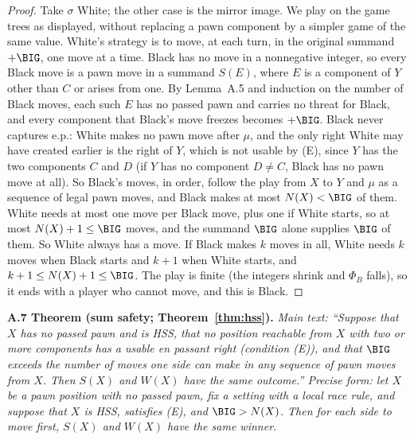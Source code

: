 \begin{proof}
Take $\sigma$ White; the other case is the mirror image. We play on the game trees as displayed, without replacing a pawn
component by a simpler game of the same value. White's strategy is to move, at each turn, in the original summand $+\BIG$, one move at a time.
Black has no move in a nonnegative integer, so every Black move is a pawn move in a summand $S(E)$, where $E$ is
a component of $Y$ other than $C$ or arises from one. By Lemma~A.5 and induction on the number of Black moves, each such $E$
has no passed pawn and carries no threat for Black, and every component that Black's move freezes becomes $+\BIG$. Black never captures
e.p.: White makes no pawn move after $\mu$, and the only right White may have created earlier is the right of $Y$, which
is not usable by (E), since $Y$ has the two components $C$ and $D$ (if $Y$ has no component $D\ne C$, Black has no pawn move
at all). So Black's moves, in order, follow the play from $X$ to $Y$ and $\mu$ as a sequence of legal pawn moves, and Black
makes at most $N(X)<\BIG$ of them. White needs at most one move per Black move, plus one if White starts, so at most
$N(X)+1\le\BIG$ moves, and the summand $\BIG$ alone supplies $\BIG$ of them. So White always has a move. If Black makes $k$ moves in all, White needs $k$ moves when Black starts and $k+1$ when White starts, and $k+1\le N(X)+1\le\BIG$. The play is finite
(the integers shrink and $\Phi_B$ falls), so it ends with a player who cannot move, and this is Black.
\end{proof}

\textbf{A.7 Theorem (sum safety; Theorem~\ref{thm:hss}).} \emph{Main text: ``Suppose that $X$ has no passed pawn and is HSS, that no position
reachable from $X$ with two or more components has a usable en passant right (condition (E)), and that $\BIG$ exceeds the
number of moves one side can make in any sequence of pawn moves from $X$. Then $S(X)$ and $W(X)$ have the same outcome.'' Precise form: let $X$ be a pawn
position with no passed pawn, fix a setting with a local race rule, and suppose that $X$ is HSS, satisfies (E), and
$\BIG>N(X)$. Then for each side to move first, $S(X)$ and $W(X)$ have the same winner.}


